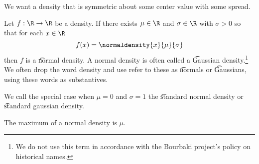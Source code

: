 

We want a density that is symmetric about some center value with some spread.



Let $f: \R \to \R$ be a density.
If there exists $\mu \in \R$ and $\sigma \in \R$ with $\sigma > 0$ so that for each $x \in \R$
\[
  f(x) = \normaldensity{x}{\mu}{\sigma}
\]
then $f$ is a \t{normal density}.
A normal density is often called a \t{Gaussian density}.\footnote{We do not use this term in accordance with the Bourbaki project's policy on historical names.}
We often drop the word density and use refer to these as \t{normals} or \t{Gaussians}, using these words as substantives.

We call the special case when $\mu = 0$ and $\sigma = 1$ the \t{standard normal density} or \t{standard gaussian density}.


The maximum of a normal density is $\mu$.

\blankpage
